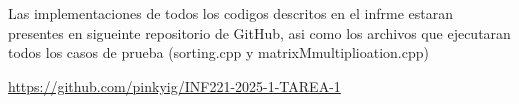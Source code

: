 Las implementaciones de todos los codigos descritos en el infrme estaran presentes en sigueinte repositorio de GitHub, asi como  los archivos que ejecutaran todos los casos de prueba (sorting.cpp y matrixMmultiplioation.cpp)

\begin{mdframed}
    \begin{center}
        {\Large \url{https://github.com/pinkyig/INF221-2025-1-TAREA-1}}
    \end{center}
\end{mdframed}


